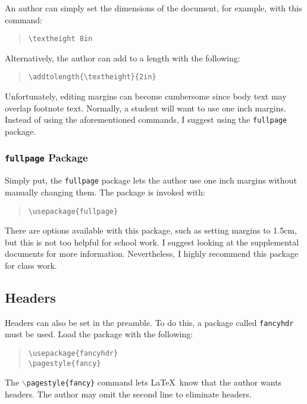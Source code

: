 \documentclass{article}
\begin{document}
An author can simply set the dimensions of the document, for example, with this command:
\begin{quote}
\begin{verbatim}
\textheight 8in
\end{verbatim}
\end{quote}
Alternatively, the author can add to a length with the following:
\begin{quote}
\begin{verbatim}
\addtolength{\textheight}{2in}
\end{verbatim}
\end{quote}

Unfortunately, editing margins can become cumbersome since body text may overlap footnote text. Normally, a student will want to use one inch margins. Instead of using the aforementioned commands, I suggest using the \texttt{fullpage} package.

\subsubsection{\texttt{fullpage} Package}

Simply put, the \texttt{fullpage} package lets the author use one inch margins without manually changing them. The package is invoked with:
\begin{quote}
\begin{verbatim}
\usepackage{fullpage}
\end{verbatim}
\end{quote}
There are options available with this package, such as setting margins to 1.5cm, but this is not too helpful for school work. I suggest looking at the supplemental documents for more information. Nevertheless, I highly recommend this package for class work.

\subsection{Headers}

Headers can also be set in the preamble. To do this, a package called \texttt{fancyhdr} must be used. Load the package with the following:
\begin{quote}
\begin{verbatim}
\usepackage{fancyhdr}
\pagestyle{fancy}
\end{verbatim}
\end{quote}
The \texttt{$\backslash$pagestyle\{fancy\}} command lets \LaTeX\ know that the author wants headers. The author may omit the second line to eliminate headers.
\end{document}
